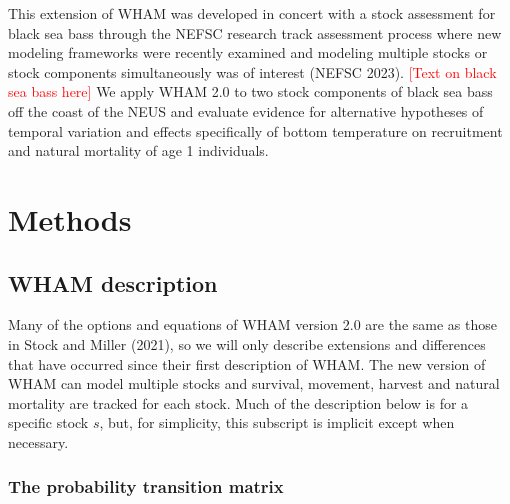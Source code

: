 \documentclass[
]{article}
\begin{document}
This extension of WHAM was developed in concert with a stock assessment
for black sea bass through the NEFSC research track assessment process
where new modeling frameworks were recently examined and modeling
multiple stocks or stock components simultaneously was of interest
(NEFSC 2023). \textcolor{red}{[Text on black sea bass here]} We apply
WHAM 2.0 to two stock components of black sea bass off the coast of the
NEUS and evaluate evidence for alternative hypotheses of temporal
variation and effects specifically of bottom temperature on recruitment
and natural mortality of age 1 individuals.

\hypertarget{methods}{%
\section*{Methods}\label{methods}}

\hypertarget{wham-description}{%
\subsection*{WHAM description}\label{wham-description}}

Many of the options and equations of WHAM version 2.0 are the same as
those in Stock and Miller (2021), so we will only describe extensions
and differences that have occurred since their first description of
WHAM. The new version of WHAM can model multiple stocks and survival,
movement, harvest and natural mortality are tracked for each stock. Much
of the description below is for a specific stock \(s\), but, for
simplicity, this subscript is implicit except when necessary.

\hypertarget{the-probability-transition-matrix}{%
\subsubsection*{The probability transition
matrix}\label{the-probability-transition-matrix}}
\end{document}
